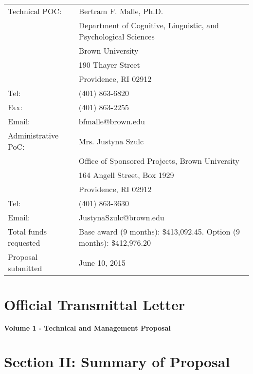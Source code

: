 \documentclass[12pt]{article}
\begin{document}
\begin{titlepage}
\begin{tabular}{ll}
Technical POC:  & Bertram F. Malle, Ph.D.\\
                & Department of Cognitive, Linguistic, and Psychological Sciences\\
                & Brown University \\
                & 190 Thayer Street \\
                & Providence, RI 02912 \\
           Tel: & (401) 863-6820 \\
           Fax: & (401) 863-2255 \\
\vspace{2mm}
         Email: & bfmalle@brown.edu \\
   Administrative PoC: & Mrs. Justyna Szulc\\
                & Office of Sponsored Projects, Brown University \\
                & 164 Angell Street, Box 1929\\
                & Providence, RI 02912 \\
          Tel:   & (401) 863-3630 \\
\vspace{2mm}
	Email: &  Justyna\textunderscore Szulc@brown.edu\\
\vspace{2mm}
          Total funds requested & Base award (9 months): \$413,092.45. Option (9 months): \$412,976.20\\ 

          Proposal submitted &  June 10, 2015

\end{tabular}

\newpage
\thispagestyle{empty}
\section*{Official Transmittal Letter} 


\end{titlepage}

\setcounter{page}{1}
\centerline {\LARGE {\bf Volume 1 - Technical and Management Proposal}}
\vspace{3mm}
\section*{Section II: Summary of Proposal}

\end{document}
